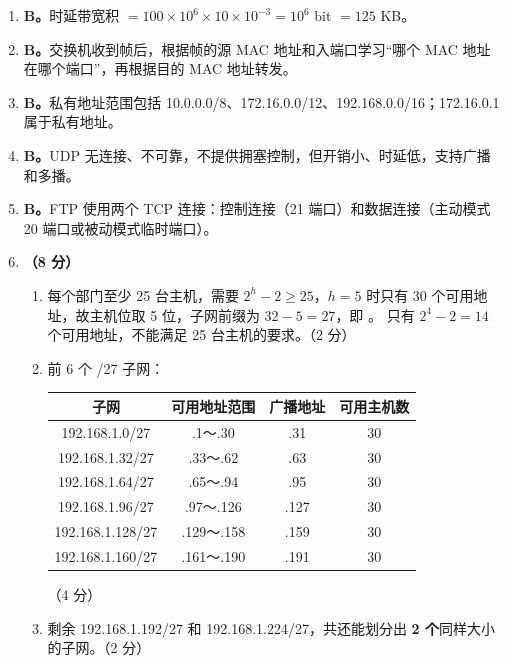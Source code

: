 \documentclass[a4paper,11pt]{article}
\begin{document}

\begin{enumerate}[start=13, label=\textbf{\arabic*.}, leftmargin=2.4em, itemsep=0.45em]

\item \textbf{B。}时延带宽积 $=100\times10^{6}\times10\times10^{-3}=10^{6}$ bit $=125$ KB。

\item \textbf{B。}交换机收到帧后，根据帧的源 MAC 地址和入端口学习“哪个 MAC 地址在哪个端口”，再根据目的 MAC 地址转发。

\item \textbf{B。}私有地址范围包括 10.0.0.0/8、172.16.0.0/12、192.168.0.0/16；172.16.0.1 属于私有地址。

\item \textbf{B。}UDP 无连接、不可靠，不提供拥塞控制，但开销小、时延低，支持广播和多播。

\item \textbf{B。}FTP 使用两个 TCP 连接：控制连接（21 端口）和数据连接（主动模式 20 端口或被动模式临时端口）。

\item \textbf{（8 分）}
\begin{enumerate}[label=（\arabic*）, leftmargin=2.2em, itemsep=1pt]
  \item 每个部门至少 25 台主机，需要 $2^{h}-2\ge25$，$h=5$ 时只有 30 个可用地址，故主机位取 5 位，子网前缀为 $32-5=27$，即 。 只有 $2^{4}-2=14$ 个可用地址，不能满足 25 台主机的要求。\hfill（2 分）
  \item 前 6 个 /27 子网：
  \begin{center}\small
  \begin{tabular}{cccc}
  \toprule
  子网 & 可用地址范围 & 广播地址 & 可用主机数 \\
  \midrule
  192.168.1.0/27 & .1～.30 & .31 & 30 \\
  192.168.1.32/27 & .33～.62 & .63 & 30 \\
  192.168.1.64/27 & .65～.94 & .95 & 30 \\
  192.168.1.96/27 & .97～.126 & .127 & 30 \\
  192.168.1.128/27 & .129～.158 & .159 & 30 \\
  192.168.1.160/27 & .161～.190 & .191 & 30 \\
  \bottomrule
  \end{tabular}
  \end{center}
  \hfill（4 分）
  \item 剩余 192.168.1.192/27 和 192.168.1.224/27，共还能划分出 \textbf{2 个}同样大小的子网。\hfill（2 分）
\end{enumerate}


\end{enumerate}
\end{document}
